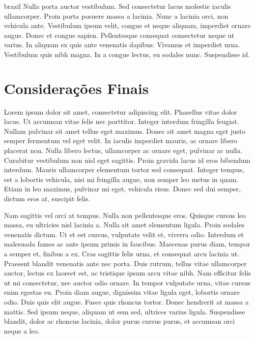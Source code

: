 \begin{otherlanguage*}{brazil}
        Nulla porta auctor vestibulum. Sed
        consectetur lacus molestie iaculis ullamcorper. Proin porta posuere massa a lacinia. Nunc a
        lacinia orci, non vehicula ante. Vestibulum ipsum velit, congue et neque aliquam, imperdiet
        ornare augue. Donec et congue sapien. Pellentesque consequat consectetur neque ut varius. In
        aliquam ex quis ante venenatis dapibus. Vivamus et imperdiet urna. Vestibulum quis nibh
        magna. In a congue lectus, eu sodales nunc. Suspendisse id.

        \section*{Considerações Finais}
        Lorem ipsum dolor sit amet, consectetur adipiscing elit. Phasellus vitae dolor lacus. Ut
        accumsan vitae felis nec porttitor. Integer interdum fringilla feugiat. Nullam pulvinar sit
        amet tellus eget maximus. Donec sit amet magna eget justo semper fermentum vel eget velit.
        In iaculis imperdiet mauris, ac ornare libero placerat non. Nulla libero lectus, ullamcorper
        ac ornare eget, pulvinar ac nulla. Curabitur vestibulum non nisl eget sagittis. Proin
        gravida lacus id eros bibendum interdum. Mauris ullamcorper elementum tortor sed consequat.
        Integer tempus, est a lobortis vehicula, nisi mi fringilla augue, non semper leo metus in
        quam. Etiam in leo maximus, pulvinar mi eget, vehicula risus. Donec sed dui semper, dictum
        eros at, suscipit felis.

        Nam sagittis vel orci at tempus. Nulla non pellentesque eros.
        Quisque cursus leo massa, eu ultricies nisl lacinia a. Nulla sit amet elementum ligula.
        Proin sodales venenatis dictum. Ut et est cursus, vulputate velit et, viverra odio. Interdum
        et malesuada fames ac ante ipsum primis in faucibus. Maecenas purus diam, tempor a semper
        et, finibus a ex. Cras sagittis felis urna, et consequat arcu lacinia ut. Praesent blandit
        venenatis ante nec porta. Duis rutrum, tellus vitae ullamcorper auctor, lectus ex laoreet
        est, ac tristique ipsum arcu vitae nibh. Nam efficitur felis ut mi consectetur, nec auctor
        odio ornare. In tempor vulputate urna, vitae cursus enim egestas eu. Proin diam augue,
        dignissim vitae ligula eget, lobortis ornare odio. Duis quis elit augue. Fusce quis rhoncus
        tortor. Donec hendrerit at massa a mattis. Sed ipsum neque, aliquam ut sem sed, ultrices
        varius ligula. Suspendisse blandit, dolor ac rhoncus lacinia, dolor purus cursus purus, et
        accumsan orci neque a leo.



    \end{otherlanguage*}

